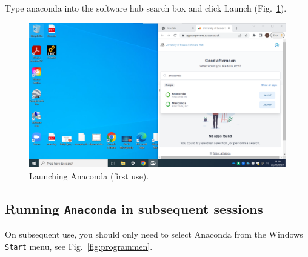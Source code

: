 Type anaconda into the software hub search box and click Launch
(Fig.~\ref{fig:anaconda_launch}).

\begin{figure}[htbp]  
\centering
\includegraphics[width=12cm]{Figures/anaconda_launch.png}
\caption{Launching Anaconda (first use).}
\label{fig:anaconda_launch}
\end{figure}

\subsection{Running \texttt{Anaconda} in subsequent sessions}

On subsequent use, you should only need to select Anaconda from the Windows {\tt Start} menu, see Fig.~\ref{fig:programmen}.

